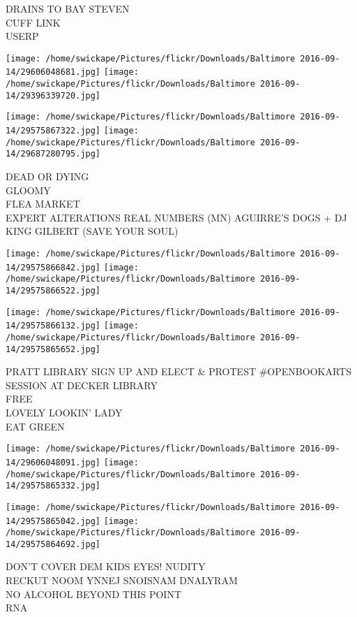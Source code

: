 \documentclass[10pt,letterpaper]{article}
\begin{document}
DRAINS TO BAY STEVEN\\
CUFF LINK\\
USERP
\pagebreak

\texttt{[image: /home/swickape/Pictures/flickr/Downloads/Baltimore 2016-09-14/29606048681.jpg]}
\texttt{[image: /home/swickape/Pictures/flickr/Downloads/Baltimore 2016-09-14/29396339720.jpg]}

\texttt{[image: /home/swickape/Pictures/flickr/Downloads/Baltimore 2016-09-14/29575867322.jpg]}
\texttt{[image: /home/swickape/Pictures/flickr/Downloads/Baltimore 2016-09-14/29687280795.jpg]}

DEAD OR DYING\\
GLOOMY\\
FLEA MARKET\\
EXPERT ALTERATIONS REAL NUMBERS (MN) AGUIRRE'S DOGS + DJ KING GILBERT (SAVE YOUR SOUL)
\pagebreak

\texttt{[image: /home/swickape/Pictures/flickr/Downloads/Baltimore 2016-09-14/29575866842.jpg]}
\texttt{[image: /home/swickape/Pictures/flickr/Downloads/Baltimore 2016-09-14/29575866522.jpg]}

\texttt{[image: /home/swickape/Pictures/flickr/Downloads/Baltimore 2016-09-14/29575866132.jpg]}
\texttt{[image: /home/swickape/Pictures/flickr/Downloads/Baltimore 2016-09-14/29575865652.jpg]}

PRATT LIBRARY SIGN UP AND ELECT \& PROTEST \#OPENBOOKARTS SESSION AT DECKER LIBRARY\\
FREE\\
LOVELY LOOKIN' LADY\\
EAT GREEN
\pagebreak

\texttt{[image: /home/swickape/Pictures/flickr/Downloads/Baltimore 2016-09-14/29606048091.jpg]}
\texttt{[image: /home/swickape/Pictures/flickr/Downloads/Baltimore 2016-09-14/29575865332.jpg]}

\texttt{[image: /home/swickape/Pictures/flickr/Downloads/Baltimore 2016-09-14/29575865042.jpg]}
\texttt{[image: /home/swickape/Pictures/flickr/Downloads/Baltimore 2016-09-14/29575864692.jpg]}

DON'T COVER DEM KIDS EYES!  NUDITY\\
RECKUT NOOM YNNEJ SNOISNAM DNALYRAM\\
NO ALCOHOL BEYOND THIS POINT\\
RNA
\pagebreak
\end{document}
